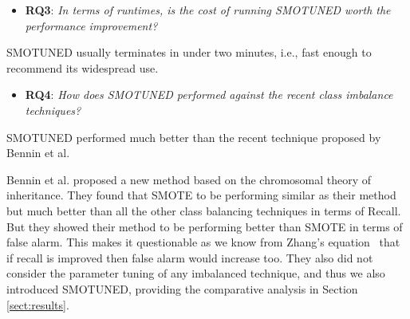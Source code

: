 \documentclass[sigconf,review, anonymous]{acmart}
\newcommand{\bi}{\begin{itemize}[leftmargin=0.4cm]}
\newcommand{\ei}{\end{itemize}}
\theoremstyle{break}
\theoremstyle{break}
\newcommand{\sma}{{\sc SMOTE}}
\newcommand{\smb}{{\sc SMOTUNED}}
\begin{document}
  
   \bi
  \item
  \textbf{RQ3}: {\em  In terms of runtimes, is the cost of running {\smb} worth the performance improvement?}
  \ei
  
   \begin{lesson}{\smb} usually terminates in under two minutes, i.e.,  fast enough
   to recommend its widespread use.
 \end{lesson}

   \bi
  \item
  \textbf{RQ4}: {\em  How does {\smb} performed against the recent class imbalance techniques?}
  \ei
  
   \begin{lesson}{\smb} performed much better than the recent technique proposed by Bennin et al.\cite{bennin2017mahakil}
 \end{lesson}
 \noindent
 Bennin et al. proposed a new method based on the chromosomal theory of inheritance. They found that {\sma} to be performing similar as their method but much better than all the other class balancing techniques in terms of Recall. But they showed their method to be performing better than {\sma} in terms of false alarm. This makes it questionable as we know from Zhang's equation~\cite{zhang2007comments} that if recall is improved then false alarm would increase too. They also did not consider the parameter tuning of any imbalanced technique, and thus we also  introduced {\smb}, providing the comparative analysis in Section \ref{sect:results}.
 
\end{document}
